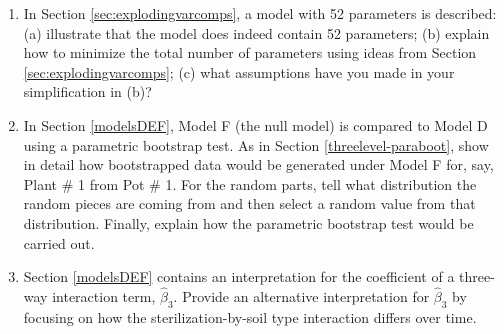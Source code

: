 \documentclass[
]{krantz}
\begin{document}
\begin{enumerate}
\item
  In Section \ref{sec:explodingvarcomps}, a model with 52 parameters is described: (a) illustrate that the model does indeed contain 52 parameters; (b) explain how to minimize the total number of parameters using ideas from Section \ref{sec:explodingvarcomps}; (c) what assumptions have you made in your simplification in (b)?
\item
  In Section \ref{modelsDEF}, Model F (the null model) is compared to Model D using a parametric bootstrap test. As in Section \ref{threelevel-paraboot}, show in detail how bootstrapped data would be generated under Model F for, say, Plant \# 1 from Pot \# 1. For the random parts, tell what distribution the random pieces are coming from and then select a random value from that distribution. Finally, explain how the parametric bootstrap test would be carried out.
\item
  Section \ref{modelsDEF} contains an interpretation for the coefficient of a three-way interaction term, \(\hat{\beta}_{3}\). Provide an alternative interpretation for \(\hat{\beta}_{3}\) by focusing on how the sterilization-by-soil type interaction differs over time.
\end{enumerate}
\end{document}
